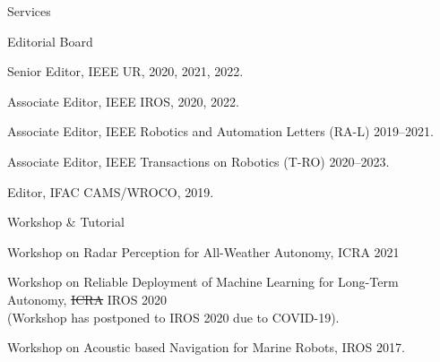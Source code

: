 \begin{rSection}{Services}
\begin{rSubsection}{Editorial Board}{}{}{}
  \item Senior Editor, IEEE UR, 2020, 2021, 2022.
  \item Associate Editor, IEEE IROS, 2020, 2022.
  \item Associate Editor, IEEE Robotics and Automation Letters (RA-L) 2019--2021.
  \item Associate Editor, IEEE Transactions on Robotics (T-RO) 2020--2023.
  \item Editor, IFAC CAMS/WROCO, 2019.
\end{rSubsection}

\newpage
\begin{rSubsection}{Workshop \& Tutorial}{}{}{}
  \item Workshop on Radar Perception for All-Weather Autonomy, ICRA 2021
  \item Workshop on Reliable Deployment of Machine Learning for Long-Term Autonomy, \sout{ICRA} IROS 2020\\
  (Workshop has postponed to IROS 2020 due to COVID-19).
  \item Workshop on Acoustic based Navigation for Marine Robots, IROS 2017.
\end{rSubsection}


\end{rSection}

